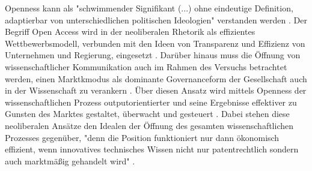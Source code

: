 Openness kann als "schwimmender Signifikant (...) ohne eindeutige Definition, adaptierbar von unterschiedlichen politischen Ideologien" verstanden werden \cite{Adema_2014}. Der Begriff Open Access wird in der neoliberalen Rhetorik als effizientes Wettbewerbsmodell, verbunden mit den Ideen von Transparenz und Effizienz von Unternehmen und Regierung, eingesetzt \cite{Tkacz_2012}. Darüber hinaus muss die Öffnung von wissenschaftlicher Kommunikation auch im Rahmen des Versuchs betrachtet werden, einen Marktkmodus als dominante Governanceform der Gesellschaft auch in der Wissenschaft zu verankern \cite[:152]{Troy_2012}. Über diesen Ansatz wird mittels Openness der wissenschaftlichen Prozess outputorientierter und seine Ergebnisse effektiver zu Gunsten des Marktes gestaltet, überwacht und gesteuert \cite{Adema_2010}. Dabei stehen diese neoliberalen Ansätze den Idealen der Öffnung des gesamten wissenschaftlichen Prozesses gegenüber, "denn die Position funktioniert nur dann ökonomisch effizient, wenn innovatives technisches Wissen nicht nur patentrechtlich sondern auch marktmäßig gehandelt wird" \cite[:179]{Troy_2012}.

